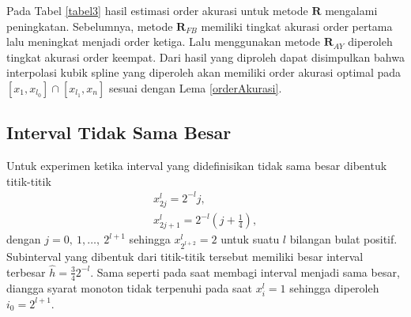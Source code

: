 \begin{table}[htp]
        \centering
        \caption{Tabel estimasi order akurasi eksperimen pertama dengan interval sama besar $h=2^{-l}$, $5 \leq l \leq 8$, $W=\{ i : 1\leq i \leq l_0 $ atau $l_1 \leq i \leq 2^{l+1}- 1\}$, $l_0 = 2^l - l - 1$ dan $l_1 =  2^l + l + 1$}
        \label{tabel3}
    \end{table}

Pada Tabel \ref{tabel3} hasil estimasi order akurasi untuk metode $\textbf{R}$ mengalami peningkatan. Sebelumnya, metode $\textbf{R}_{FB}$ memiliki tingkat akurasi order pertama lalu meningkat menjadi order ketiga. Lalu menggunakan metode $\textbf{R}_{AY}$ diperoleh tingkat akurasi order keempat. Dari hasil yang diproleh dapat disimpulkan bahwa interpolasi kubik spline yang diperoleh akan memiliki order akurasi optimal pada $[x_1, x_{l_0}] \cap [x_{l_1}, x_n]$ sesuai dengan Lema \ref{orderAkurasi}.

\subsection{Interval Tidak Sama Besar}

Untuk experimen ketika interval yang didefinisikan tidak sama besar dibentuk titik-titik
\begin{align*}
    x_{2j}^l = 2^{-l}j,\\
    x_{2j + 1}^l = 2^{-l}(j + \frac{1}{4}),
\end{align*}
dengan $j = 0,~1,\dots,~2^{l+1}$ sehingga $x_{2^{l+2}}^l = 2$ untuk suatu $l$ bilangan bulat positif. Subinterval yang dibentuk dari titik-titik tersebut memiliki besar interval terbesar $\hat{h}=\frac{3}{4}2^{-l}$. Sama seperti pada saat membagi interval menjadi sama besar, diangga syarat monoton tidak terpenuhi pada saat $x_i^l=1$ sehingga diperoleh $i_0 = 2^{l+1}$.

